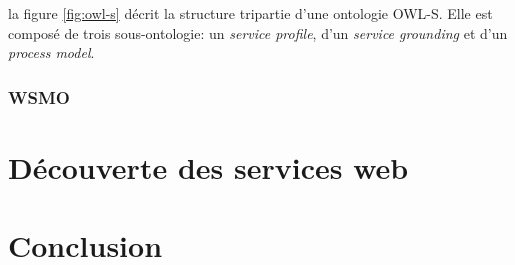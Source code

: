 	    la figure \ref{fig:owl-s} décrit la structure tripartie d'une ontologie \textsc{OWL-S}. Elle est composé 
	    de trois sous-ontologie: un \emph{service profile}, d'un \emph{service grounding} 
	    et d'un \emph{process model}.
	    \subsubsection{WSMO}
	    \cite{baryannis2010}
\section{Découverte des services web}

\section{Conclusion}
